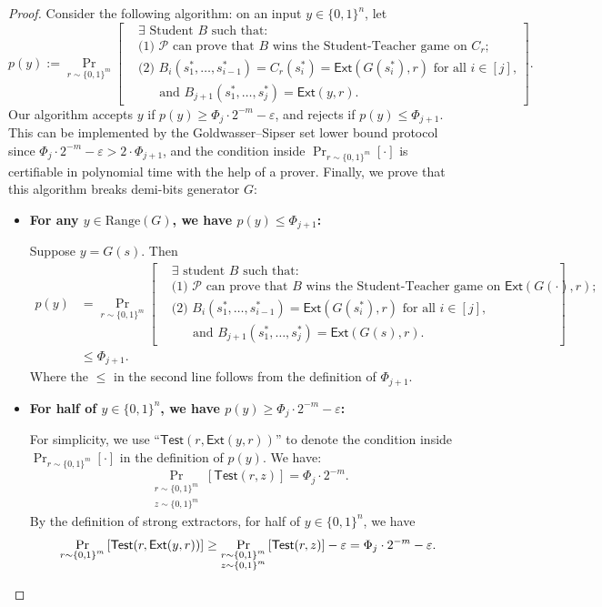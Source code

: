 \documentclass[10pt,a4paper]{article}
\theoremstyle{definition}
\theoremstyle{remark}
\newcommand{\eps}{\varepsilon}
\newcommand{\Ext}{\mathsf{Ext}}
\newcommand{\calP}{\mathcal{P}}
\newcommand{\Range}{\mathrm{Range}}
\begin{document}
\begin{proof}
    Consider the following algorithm: on an input $y\in\{0,1\}^n$, let
    \[
        p(y):=\Pr_{r\sim\{0,1\}^m}\left[\begin{aligned}
            &\text{$\exists$ Student $B$ such that:}\\
            &\text{(1) $\calP$ can prove that $B$ wins the Student-Teacher game on $C_r$;}\\
            &\text{(2) $B_i(s_1^*,\dots,s_{i-1}^*)=C_r(s_i^*) = \Ext(G(s_{i}^*),r)$ for all $i\in[j]$,}\\
            &\text{~~~~~and $B_{j+1}(s_1^*,\dots,s_j^*)=\Ext(y,r)$.}
        \end{aligned}\right].
    \]
    Our algorithm accepts $y$ if $p(y)\geq\Phi_j\cdot2^{-m}-\eps$, and rejects if $p(y)\leq\Phi_{j+1}$. This can be implemented by the Goldwasser--Sipser set lower bound protocol since $\Phi_j\cdot2^{-m}-\eps>2\cdot\Phi_{j+1}$, and the condition inside $\Pr_{r\sim\{0,1\}^m}[\cdot]$ is certifiable in polynomial time with the help of a prover. Finally, we prove that this algorithm breaks demi-bits generator $G$:
    \begin{itemize}
        \item {\bf For any $y\in \Range(G)$, we have $p(y)\leq\Phi_{j+1}$:}\par
        Suppose $y=G(s)$. Then
        \begin{align*}
            p(y)&=\Pr_{r\sim\{0,1\}^m}\left[\begin{aligned}
                &\text{$\exists$ student $B$ such that:}\\
                &\text{(1) $\calP$ can prove that $B$ wins the Student-Teacher game on $\Ext(G(\cdot),r)$;}\\
                &\text{(2) $B_i(s_1^*,\dots,s_{i-1}^*)=\Ext(G(s_{i}^*),r)$ for all $i\in[j]$,}\\
                &\text{~~~~~and $B_{j+1}(s_1^*,\dots,s_j^*)=\Ext(G(s),r)$.}
            \end{aligned}\right]\\
            &\leq\Phi_{j+1}.
        \end{align*}
        Where the $\leq$ in the second line follows from the definition of $\Phi_{j+1}$.
        \item {\bf For half of $y\in \{0,1\}^n$, we have $p(y)\geq\Phi_j\cdot2^{-m}-\eps$:}\par
        For simplicity, we use ``$\mathsf{Test}(r,\Ext(y,r))$'' to denote the condition inside $\Pr_{r\sim\{0,1\}^m}[\cdot]$ in the definition of $p(y)$. We have:
        \[
            \Pr_{\substack{r\sim\{0,1\}^m\\z\sim\{0,1\}^m}}\left[\mathsf{Test}(r,z)\right]=\Phi_j\cdot 2^{-m}.
        \]
        By the definition of strong extractors, for half of $y\in\{0,1\}^n$, we have
        \[
            \Pr_{\substack{r\sim\{0,1\}^m}}\left[\mathsf{Test}(r,\Ext(y,r))\right]\geq\Pr_{\substack{r\sim\{0,1\}^m\\z\sim\{0,1\}^m}}\left[\mathsf{Test}(r,z)\right]-\eps=\Phi_j\cdot 2^{-m}-\eps.\qedhere
        \]
    \end{itemize}
\end{proof}
\end{document}
